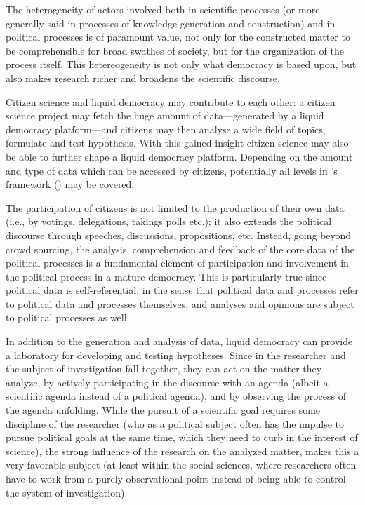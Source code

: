 The heterogeneity of actors involved both in scientific processes (or more generally said in processes of knowledge generation and construction) and in political processes is of paramount value, not only for the constructed matter to be comprehensible for broad swathes of society, but for the organization of the process itself. This hetereogeneity is not only what democracy is based upon, but also makes research richer and broadens the scientific discourse.


Citizen science and liquid democracy may contribute to each other: a citizen science project may fetch the huge amount of data---generated by a liquid democracy platform---and citizens may then analyse a wide field of topics, formulate and test hypothesis. With this gained insight citizen science may also be able to further shape a liquid democracy platform. Depending on the amount and type of data which can be accessed by citizens, potentially all levels in \citeauthor{Hakalay2014}’s framework (\citeyear{Hakalay2014}) may be covered.

The participation of citizens is not limited to the production of their own data (i.e., by votings, delegations, takings polls etc.); it also extends the political discourse through speeches, discussions, propositions, etc. Instead, going beyond crowd sourcing, the analysis, comprehension and feedback of the core data of the political processes is a fundamental element of participation and involvement in the political process in a mature democracy. This is particularly true since political data is self-referential, in the sense that political data and processes refer to political data and processes themselves, and analyses and opinions are subject to political processes as well.

In addition to the generation and analysis of data, liquid democracy can provide a laboratory for developing and testing hypotheses. Since in  the researcher and the subject of investigation fall together, they can act on the matter they analyze, by actively participating in the discourse with an agenda (albeit a scientific agenda instead of a political agenda), and by observing the process of the agenda unfolding. While the pursuit of a scientific goal requires some discipline of the researcher (who as a political subject often has the impulse to pursue political goals at the same time, which they need to curb in the interest of science), the strong influence of the research on the analyzed matter, makes this a very favorable subject (at least within the social sciences, where researchers often have to work from a purely observational point instead of being able to control the system of investigation). 

